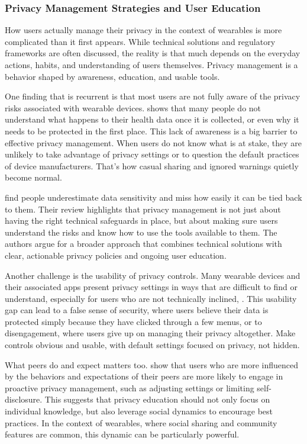 	\subsubsection{Privacy Management Strategies and User Education}

	How users actually manage their privacy in the context of wearables is more complicated than it first appears. While technical solutions and regulatory frameworks are often discussed, the reality is that much depends on the everyday actions, habits, and understanding of users themselves. Privacy management is a behavior shaped by awareness, education, and usable tools.

	One finding that is recurrent is that most users are not fully aware of the privacy risks associated with wearable devices. \cite{Cilliers2019} shows that many people do not understand what happens to their health data once it is collected, or even why it needs to be protected in the first place. This lack of awareness is a big barrier to effective privacy management. When users do not know what is at stake, they are unlikely to take advantage of privacy settings or to question the default practices of device manufacturers. That's how casual sharing and ignored warnings quietly become normal.

	\cite{Datta2018} find people underestimate data sensitivity and miss how easily it can be tied back to them. Their review highlights that privacy management is not just about having the right technical safeguards in place, but about making sure users understand the risks and know how to use the tools available to them. The authors argue for a broader approach that combines technical solutions with clear, actionable privacy policies and ongoing user education. 

	Another challenge is the usability of privacy controls. Many wearable devices and their associated apps present privacy settings in ways that are difficult to find or understand, especially for users who are not technically inclined, \cite{Safavi2014}. This usability gap can lead to a false sense of security, where users believe their data is protected simply because they have clicked through a few menus, or to disengagement, where users give up on managing their privacy altogether. Make controls obvious and usable, with default settings focused on privacy, not hidden.

	What peers do and expect matters too.\cite{Li2019} show that users who are more influenced by the behaviors and expectations of their peers are more likely to engage in proactive privacy management, such as adjusting settings or limiting self-disclosure. This suggests that privacy education should not only focus on individual knowledge, but also leverage social dynamics to encourage best practices. In the context of wearables, where social sharing and community features are common, this dynamic can be particularly powerful.

